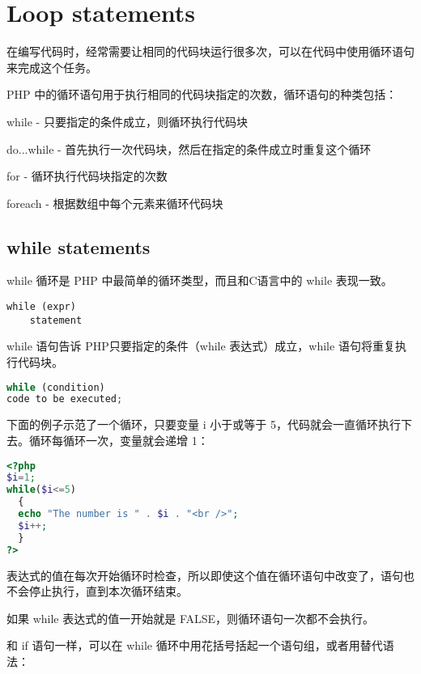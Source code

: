 \section{Loop statements}



在编写代码时，经常需要让相同的代码块运行很多次，可以在代码中使用循环语句来完成这个任务。


PHP 中的循环语句用于执行相同的代码块指定的次数，循环语句的种类包括：


\begin{compactitem}
\item while - 只要指定的条件成立，则循环执行代码块
\item do...while - 首先执行一次代码块，然后在指定的条件成立时重复这个循环
\item for - 循环执行代码块指定的次数
\item foreach - 根据数组中每个元素来循环代码块
\end{compactitem}



\subsection{while statements}

while 循环是 PHP 中最简单的循环类型，而且和C语言中的 while 表现一致。

\begin{verbatim}
while (expr)
    statement
\end{verbatim}

while 语句告诉 PHP只要指定的条件（while 表达式）成立，while 语句将重复执行代码块。


\begin{lstlisting}[language=PHP]
while (condition)
code to be executed;
\end{lstlisting}

下面的例子示范了一个循环，只要变量 i 小于或等于 5，代码就会一直循环执行下去。循环每循环一次，变量就会递增 1：

\begin{lstlisting}[language=PHP]
<?php 
$i=1;
while($i<=5)
  {
  echo "The number is " . $i . "<br />";
  $i++;
  }
?>
\end{lstlisting}

表达式的值在每次开始循环时检查，所以即使这个值在循环语句中改变了，语句也不会停止执行，直到本次循环结束。

如果 while 表达式的值一开始就是 FALSE，则循环语句一次都不会执行。

和 if 语句一样，可以在 while 循环中用花括号括起一个语句组，或者用替代语法：

